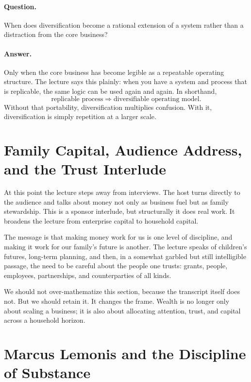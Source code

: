 \paragraph{Question.} When does diversification become a rational extension of a system rather than a distraction from the core business?

\paragraph{Answer.} Only when the core business has become legible as a repeatable operating structure. The lecture says this plainly: when you have a system and process that is replicable, the same logic can be used again and again. In shorthand,
\begin{equation}
\text{replicable process} \Rightarrow \text{diversifiable operating model}.
\end{equation}
Without that portability, diversification multiplies confusion. With it, diversification is simply repetition at a larger scale.

\section{Family Capital, Audience Address, and the Trust Interlude}

At this point the lecture steps away from interviews. The host turns directly to the audience and talks about money not only as business fuel but as family stewardship. This is a sponsor interlude, but structurally it does real work. It broadens the lecture from enterprise capital to household capital.

The message is that making money work for us is one level of discipline, and making it work for our family's future is another. The lecture speaks of children's futures, long-term planning, and then, in a somewhat garbled but still intelligible passage, the need to be careful about the people one trusts: grants, people, employees, partnerships, and counterparties of all kinds.

We should not over-mathematize this section, because the transcript itself does not. But we should retain it. It changes the frame. Wealth is no longer only about scaling a business; it is also about allocating attention, trust, and capital across a household horizon.

\section{Marcus Lemonis and the Discipline of Substance}

